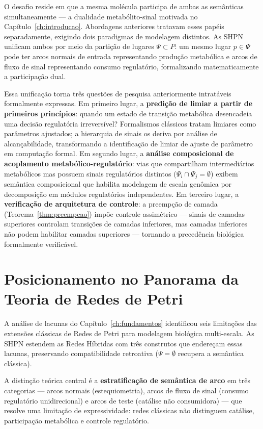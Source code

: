 O desafio reside em que a mesma molécula participa de ambas as semânticas
simultaneamente — a dualidade metabólito-sinal motivada no
Capítulo~\ref{ch:introducao}.
Abordagens anteriores tratavam esses papéis separadamente, exigindo dois
paradigmas de modelagem distintos.
As SHPN unificam ambos por meio da partição de lugares $\Psi \subset P$: um
mesmo lugar $p \in \Psi$ pode ter arcos normais de entrada representando
produção metabólica e arcos de fluxo de sinal representando consumo regulatório,
formalizando matematicamente a participação dual.

Essa unificação torna três questões de pesquisa anteriormente intratáveis
formalmente expressas.
Em primeiro lugar, a \textbf{predição de limiar a partir de primeiros
princípios}: quando um estado de transição metabólica desencadeia uma
decisão regulatória irreversível?
Formalismos clássicos tratam limiares como parâmetros ajustados; a hierarquia
de sinais os deriva por análise de alcançabilidade, transformando a
identificação de limiar de ajuste de parâmetro em computação formal.
Em segundo lugar, a \textbf{análise composicional de acoplamento
metabólico-regulatório}: vias que compartilham intermediários metabólicos mas
possuem sinais regulatórios distintos ($\Psi_i \cap \Psi_j = \emptyset$) exibem
semântica composicional que habilita modelagem de escala genômica por
decomposição em módulos regulatórios independentes.
Em terceiro lugar, a \textbf{verificação de arquitetura de controle}: a preempção
de camada (Teorema~\ref{thm:preempcao}) impõe controle assimétrico —
sinais de camadas superiores controlam transições de camadas inferiores, mas
camadas inferiores não podem habilitar camadas superiores — tornando a
precedência biológica formalmente verificável.

\section{Posicionamento no Panorama da Teoria de Redes de Petri}
\label{sec:posicionamento-teoria}

A análise de lacunas do Capítulo~\ref{ch:fundamentos} identificou seis
limitações das extensões clássicas de Redes de Petri para modelagem biológica
multi-escala.
As SHPN estendem as Redes Híbridas com três construtos que endereçam essas
lacunas, preservando compatibilidade retroativa ($\Psi = \emptyset$ recupera a
semântica clássica).

A distinção teórica central é a \textbf{estratificação de semântica de arco}
em três categorias --- arcos normais (estequiometria), arcos de fluxo de sinal
(consumo regulatório unidirecional) e arcos de teste (catálise não consumidora)
--- que resolve uma limitação de expressividade: redes clássicas não distinguem
catálise, participação metabólica e controle regulatório.

